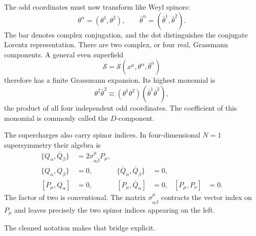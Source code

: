 The odd coordinates must now transform like Weyl spinors:
\begin{equation}
\theta^\alpha=(\theta^1,\theta^2),
\qquad
\bar\theta^{\dot\alpha}=(\bar\theta^{\dot1},\bar\theta^{\dot2}).
\end{equation}
The bar denotes complex conjugation, and the dot distinguishes the conjugate Lorentz representation. There are two complex, or four real, Grassmann components. A general even superfield
\begin{equation}
\mathcal S=\mathcal S(x^\mu,\theta^\alpha,\bar\theta^{\dot\alpha})
\end{equation}
therefore has a finite Grassmann expansion. Its highest monomial is
\begin{equation}
\theta^2\bar\theta^2
\equiv
(\theta^1\theta^2)(\bar\theta^{\dot1}\bar\theta^{\dot2}),
\end{equation}
the product of all four independent odd coordinates. The coefficient of this monomial is commonly called the \(D\)-component.

The supercharges also carry spinor indices. In four-dimensional \(N=1\) supersymmetry their algebra is
\begin{align}
\{Q_\alpha,\bar Q_{\dot\beta}\}
&=2\sigma^\mu_{\alpha\dot\beta}P_\mu,
\label{eq:l8-superalgebra-main}\\
\{Q_\alpha,Q_\beta\}&=0,
&
\{\bar Q_{\dot\alpha},\bar Q_{\dot\beta}\}&=0,
\label{eq:l8-superalgebra-nilpotent}\\
[P_\mu,Q_\alpha]&=0,
&
[P_\mu,\bar Q_{\dot\alpha}]&=0,
&
[P_\mu,P_\nu]&=0.
\label{eq:l8-superalgebra-commutators}
\end{align}
The factor of two is conventional. The matrix
\(\sigma^\mu_{\alpha\dot\beta}\) contracts the vector index on \(P_\mu\) and leaves precisely the two spinor indices appearing on the left.

\begin{classroomqa}
\end{classroomqa}

The cleaned notation makes that bridge explicit.

